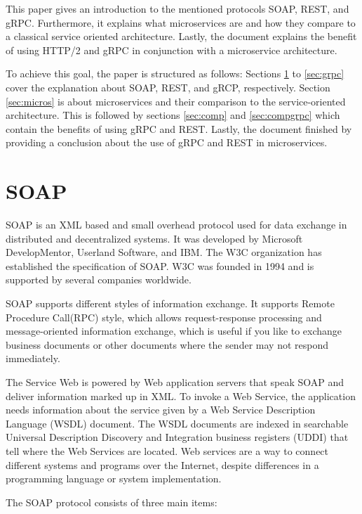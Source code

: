 \documentclass[conference]{IEEEtran}
\begin{document}
This paper gives an introduction to the mentioned protocols SOAP, REST, and gRPC. Furthermore, it explains what microservices are and how they compare to a classical service oriented architecture. Lastly, the document explains the benefit of using HTTP/2 and gRPC in conjunction with a microservice architecture.

To achieve this goal, the paper is structured as follows: Sections \ref{sec:soap} to \ref{sec:grpc} cover the explanation about SOAP, REST, and gRCP, respectively. Section \ref{sec:micros} is about microservices and their comparison to the service-oriented architecture. This is followed by sections \ref{sec:comp} and \ref{sec:compgrpc} which contain the benefits of using gRPC and REST. Lastly, the document finished by providing a conclusion about the use of gRPC and REST in microservices.

\section{SOAP}
\label{sec:soap}

SOAP is an XML based and small overhead protocol used for data exchange in distributed and decentralized systems.
It was developed by Microsoft DevelopMentor, Userland Software, and IBM. The W3C organization has established the specification of SOAP. W3C was founded in 1994 and is supported by several companies worldwide. \cite{SOA-basic-overview-2002}

SOAP supports different styles of information exchange. It supports Remote Procedure Call(RPC) style, which allows request-response processing and message-oriented information exchange, which is useful if you like to exchange business documents or other documents where the sender may not respond immediately. \cite{SOA-basic-overview-2002}

The Service Web is powered by Web application servers that speak SOAP and deliver information marked up in XML. To invoke a Web Service, the application needs information about the service given by a Web Service Description Language (WSDL) document. The WSDL documents are indexed in searchable Universal Description Discovery and Integration business registers (UDDI) that tell where the Web Services are located. \cite{SOA-basic-overview-2002} Web services are a way to connect different systems and programs over the Internet, despite differences in a programming language or system implementation.

The SOAP protocol consists of three main items:
\end{document}
